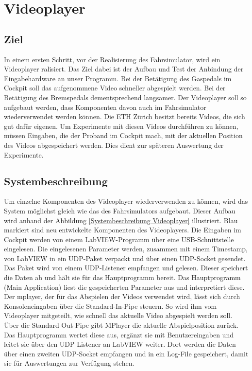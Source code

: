\section{Videoplayer}
\subsection{Ziel}
In einem ersten Schritt, vor der Realisierung des Fahrsimulator, wird ein Videoplayer ralisiert. Das Ziel dabei ist der Aufbau und Test der Anbindung der Eingabehardware an unser Programm. Bei der Betätigung des Gaspedals im Cockpit soll das aufgenommene Video schneller abgespielt werden. Bei der Betätigung des Bremspedals dementsprechend langsamer. Der Videoplayer soll so aufgebaut werden, dass Komponenten davon auch im Fahrsimulator wiederverwendet werden können. Die ETH Zürich besitzt bereits Videos, die sich gut dafür eigenen. Um Experimente mit diesen Videos durchführen zu können, müssen Eingaben, die der Proband im Cockpit mach, mit der aktuellen Position des Videos abgespeichert werden. Dies dient zur späteren Auswertung der Experimente.
\\
\subsection{Systembeschreibung}

Um einzelne Komponenten des Videoplayer wiederverwenden zu können, wird das System möglichst gleich wie das des Fahrsimulators aufgebaut. Dieser Aufbau wird anhand der Abbildung \ref{Systembeschreibung Videoplayer} illustriert. Blau markiert sind neu entwickelte Komponenten des Videoplayers. Die Eingaben im Cockpit werden von einem LabVIEW-Programm über eine USB-Schnittstelle eingelesen. Die eingelesenen Parameter werden, zusammen mit einem Timestamp, von LabVIEW in ein UDP-Paket verpackt und über einen UDP-Socket gesendet. Das Paket wird von einem UDP-Listener empfangen und gelesen. Dieser speichert die Daten ab und hält sie für das Hauptprogramm bereit. Das Hauptprogramm (Main Application) liest die gespeicherten Parameter aus und interpretiert diese. Der \gls{mplayer}, der für das Abspielen der Videos verwendet wird, lässt sich durch Konsoleneingaben über die Standard-In-Pipe steuern. So wird ihm vom Videoplayer mitgeteilt, wie schnell das aktuelle Video abgespielt werden soll.  Über die Standard-Out-Pipe gibt MPlayer die aktuelle Abspielposition zurück. Das Hauptprogramm wertet diese aus, ergänzt sie mit Benutzereingaben und leitet sie über den UDP-Listener an LabVIEW weiter. Dort werden die Daten über  einen zweiten UDP-Socket empfangen und in ein Log-File gespeichert, damit sie für Auswertungen zur Verfügung stehen.
\newpage

